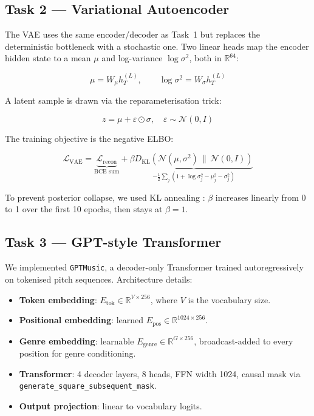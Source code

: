 \documentclass{article} %
\begin{document}
\subsection{Task 2 --- Variational Autoencoder \citep{Kingma2013AutoEncodingVB}}

The VAE uses the same encoder/decoder as Task~1 but replaces the deterministic bottleneck with a stochastic one. Two linear heads map the encoder hidden state to a mean $\mu$ and log-variance $\log\sigma^2$, both in $\mathbb{R}^{64}$:

\[
  \mu = W_\mu h_T^{(L)}, \qquad \log\sigma^2 = W_\sigma h_T^{(L)}
\]

A latent sample is drawn via the reparameterisation trick:

\[
  z = \mu + \varepsilon \odot \sigma, \quad \varepsilon \sim \mathcal{N}(0, I)
\]

The training objective is the negative ELBO:

\[
  \mathcal{L}_{\text{VAE}} = \underbrace{\mathcal{L}_{\text{recon}}}_{\text{BCE sum}} + \beta \underbrace{D_{\mathrm{KL}}\!\left(\mathcal{N}(\mu,\sigma^2)\,\|\,\mathcal{N}(0,I)\right)}_{\displaystyle -\frac{1}{2}\sum_j(1+\log\sigma^2_j - \mu_j^2 - \sigma^2_j)}
\]

To prevent posterior collapse, we used KL annealing \citep{Bowman2015GeneratingSF}: $\beta$ increases linearly from 0 to 1 over the first 10 epochs, then stays at $\beta{=}1$.

\subsection{Task 3 --- GPT-style Transformer}

We implemented \texttt{GPTMusic}, a decoder-only Transformer \citep{Vaswani2017AttentionIA, Huang2018MusicTG} trained autoregressively on tokenised pitch sequences. Architecture details:

\begin{itemize}
  \item \textbf{Token embedding}: $E_\text{tok} \in \mathbb{R}^{V \times 256}$, where $V$ is the vocabulary size.
  \item \textbf{Positional embedding}: learned $E_\text{pos} \in \mathbb{R}^{1024 \times 256}$.
  \item \textbf{Genre embedding}: learnable $E_\text{genre} \in \mathbb{R}^{G \times 256}$, broadcast-added to every position for genre conditioning.
  \item \textbf{Transformer}: 4 decoder layers, 8 heads, FFN width 1024, causal mask via \texttt{generate\_square\_subsequent\_mask}.
  \item \textbf{Output projection}: linear to vocabulary logits.
\end{itemize}
\end{document}
